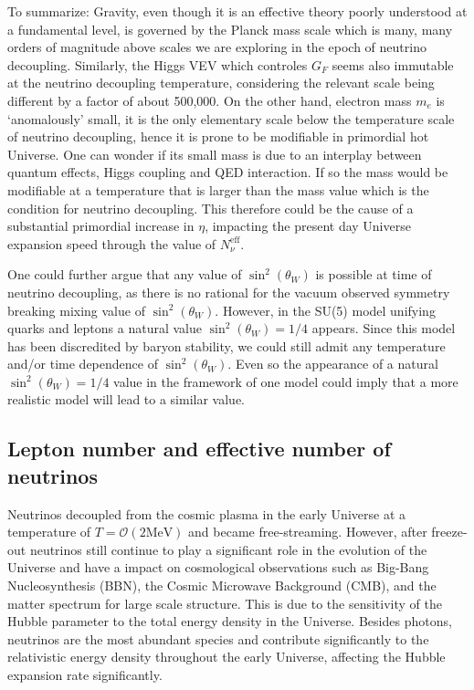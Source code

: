 To summarize: Gravity, even though it is an effective theory poorly understood at a fundamental level, is governed by the Planck mass scale which is many, many orders of magnitude above scales we are exploring in the epoch of neutrino decoupling. Similarly, the Higgs VEV which controles $G_F$ seems also immutable at the neutrino decoupling temperature, considering the relevant scale being different by a factor of about 500,000. On the other hand, electron mass $m_e$ is `anomalously' small, it is the only elementary scale below the temperature scale of neutrino decoupling, hence it is prone to be modifiable in primordial hot Universe. One can wonder if its small mass is due to an interplay between quantum effects, Higgs coupling and QED interaction. If so the mass would be modifiable at a temperature that is larger than the mass value which is the condition for neutrino decoupling. This therefore could be the cause of a substantial primordial increase in $\eta$, impacting the present day Universe expansion speed through the value of $N_\nu^\mathrm{eff}$.
 
One could further argue that any value of $\sin^2(\theta_W)$ is possible at time of neutrino decoupling, as there is no rational for the vacuum observed symmetry breaking mixing value of $\sin^2(\theta_W)$. However, in the SU(5) model unifying quarks and leptons a natural value $\sin^2(\theta_W)=1/4$ appears. Since this model has been discredited by baryon stability, we could still admit any temperature and/or time dependence of $\sin^2(\theta_W)$. Even so the appearance of a natural $\sin^2(\theta_W)=1/4$ value in the framework of one model could imply that a more realistic model will lead to a similar value.


\subsection{Lepton number and effective number of neutrinos}\label{sec:N_eff_intro}

Neutrinos decoupled from the cosmic plasma in the early Universe at a temperature of $T=\mathcal{O}(2\mathrm{MeV})$ and became free-streaming. However, after freeze-out neutrinos still continue to play a significant role in the evolution of the Universe and have a impact on cosmological observations such as Big-Bang Nucleosynthesis (BBN), the Cosmic Microwave Background (CMB), and the matter spectrum for large scale structure. This is due to the sensitivity of the Hubble parameter to the total energy density in the Universe. Besides photons, neutrinos are the most abundant species and contribute significantly to the relativistic energy density throughout the early Universe, affecting the Hubble expansion rate significantly. 

